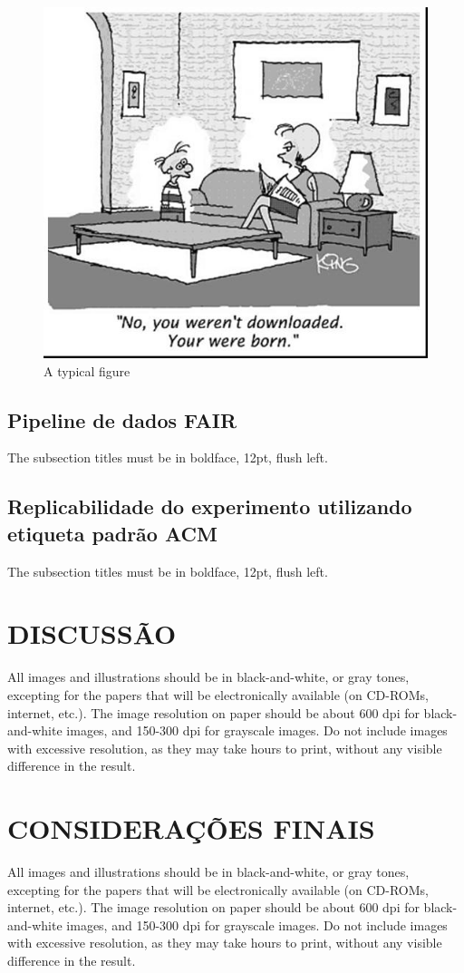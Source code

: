 \documentclass[12pt]{article}
\begin{document}
\begin{figure}[ht]
\centering
\includegraphics[width=.5\textwidth]{fig1.jpg}
\caption{A typical figure}
\label{fig:exampleFig1}
\end{figure}

\subsection{Pipeline de dados FAIR}

The subsection titles must be in boldface, 12pt, flush left.

\subsection{Replicabilidade do experimento utilizando etiqueta padrão ACM}

The subsection titles must be in boldface, 12pt, flush left.


\section{DISCUSSÃO}

All images and illustrations should be in black-and-white, or gray tones,
excepting for the papers that will be electronically available (on CD-ROMs,
internet, etc.). The image resolution on paper should be about 600 dpi for
black-and-white images, and 150-300 dpi for grayscale images.  Do not include
images with excessive resolution, as they may take hours to print, without any
visible difference in the result. 

\section{CONSIDERAÇÕES FINAIS}

All images and illustrations should be in black-and-white, or gray tones,
excepting for the papers that will be electronically available (on CD-ROMs,
internet, etc.). The image resolution on paper should be about 600 dpi for
black-and-white images, and 150-300 dpi for grayscale images.  Do not include
images with excessive resolution, as they may take hours to print, without any
visible difference in the result. 
\end{document}
